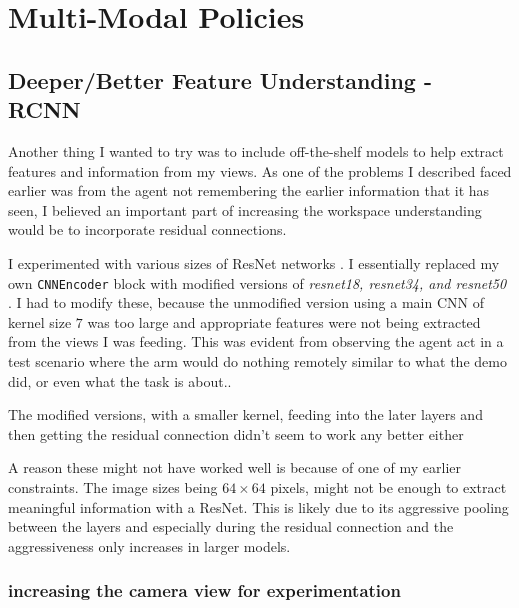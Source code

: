 \section{Multi-Modal Policies}
\subsection{Deeper/Better Feature Understanding - RCNN}
Another thing I wanted to try was to include off-the-shelf models to help extract features and information from my views. As one of the problems I described faced earlier was from the agent not remembering the earlier information that it has seen, I believed an important part of increasing the workspace understanding would be to incorporate residual connections.

I experimented with various sizes of ResNet networks . I essentially replaced my own \verb|CNNEncoder| block with modified versions of \emph{resnet18, resnet34, and resnet50} . I had to modify these, because the unmodified version using a main CNN of kernel size $7$ was too large and appropriate features were not being extracted from the views I was feeding. This was evident from observing the agent act in a test scenario where the arm would do nothing remotely similar to what the demo did, or even what the task is about.. 

The modified versions, with a smaller kernel, feeding into the later layers and then getting the residual connection didn't seem to work any better either 

A reason these might not have worked well is because of one of my earlier constraints. The image sizes being \(64 \times 64\) pixels, might not be enough to extract meaningful information with a ResNet. This is likely due to its aggressive pooling between the layers and especially during the residual connection and the aggressiveness only increases in larger models.  

\subsubsection{increasing the camera view for experimentation}



